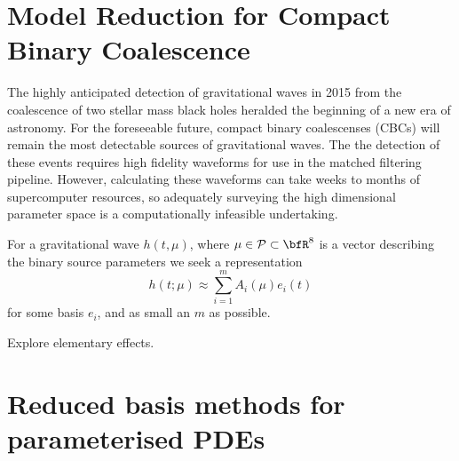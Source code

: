 %
%

\chapter{Model Reduction for Compact Binary Coalescence}

The highly anticipated detection of gravitational waves in 2015 from the coalescence of two stellar mass black holes heralded the beginning of a new era of astronomy. For the foreseeable future, compact binary coalescenses (CBCs) will remain the most detectable sources of gravitational waves. The the detection of these events requires high fidelity waveforms for use in the matched filtering pipeline. However, calculating these waveforms can take weeks to months of supercomputer resources, so adequately surveying the high dimensional parameter space is a computationally infeasible undertaking.

For a gravitational wave $h(t,\mu)$, where $\mu \in \mathcal{P} \subset \bfR^8$ is a vector describing the binary source parameters we seek a representation
\begin{equation}
h(t;\mu) \approx \sum_{i=1}^m A_i (\mu) e_i(t)
\end{equation}
for some basis $e_i$, and as small an $m$ as possible. 

Explore elementary effects.

\chapter{Reduced basis methods for parameterised PDEs}


